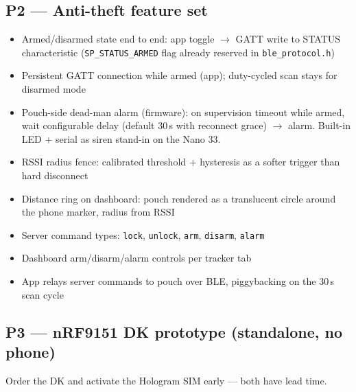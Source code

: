 \documentclass[11pt,a4paper]{article}
\newcommand{\todo}{$\square$}
\begin{document}
\subsection{P2 --- Anti-theft feature set}

\begin{itemize}
  \item[\todo] Armed/disarmed state end to end: app toggle $\rightarrow$ GATT write to STATUS characteristic (\texttt{SP\_STATUS\_ARMED} flag already reserved in \texttt{ble\_protocol.h})
  \item[\todo] Persistent GATT connection while armed (app); duty-cycled scan stays for disarmed mode
  \item[\todo] Pouch-side dead-man alarm (firmware): on supervision timeout while armed, wait configurable delay (default 30\,s with reconnect grace) $\rightarrow$ alarm. Built-in LED + serial as siren stand-in on the Nano 33.
  \item[\todo] RSSI radius fence: calibrated threshold + hysteresis as a softer trigger than hard disconnect
  \item[\todo] Distance ring on dashboard: pouch rendered as a translucent circle around the phone marker, radius from RSSI
  \item[\todo] Server command types: \texttt{lock}, \texttt{unlock}, \texttt{arm}, \texttt{disarm}, \texttt{alarm}
  \item[\todo] Dashboard arm/disarm/alarm controls per tracker tab
  \item[\todo] App relays server commands to pouch over BLE, piggybacking on the 30\,s scan cycle
\end{itemize}

\subsection{P3 --- nRF9151 DK prototype (standalone, no phone)}

Order the DK and activate the Hologram SIM early --- both have lead time.
\end{document}
